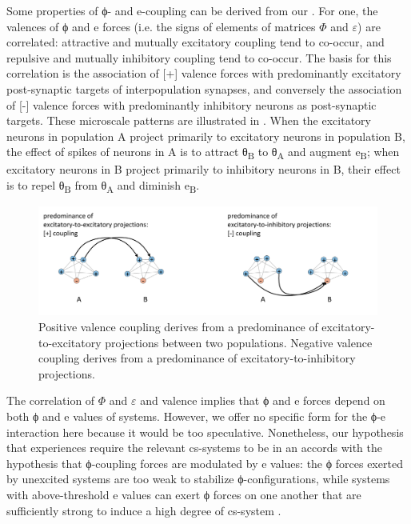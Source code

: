 

  Some properties of ϕ- and e-coupling can be derived from our . For one, the valences of ϕ and e forces (i.e. the signs of elements of matrices $\Phi$ and $\varepsilon $) are correlated: attractive and mutually excitatory coupling tend to co-occur, and repulsive and mutually inhibitory coupling tend to co-occur. The basis for this correlation is the association of [+] valence forces with predominantly excitatory post-synaptic targets of interpopulation synapses, and conversely the association of [-] valence forces with predominantly inhibitory neurons as post-synaptic targets. These microscale patterns are illustrated in {}. When the excitatory neurons in population A project primarily to excitatory neurons in population B, the effect of spikes of neurons in A is to attract θ\textsubscript{B} to θ\textsubscript{A} and augment e\textsubscript{B}; when excitatory neurons in B project primarily to inhibitory neurons in B, their effect is to repel θ\textsubscript{B} from θ\textsubscript{A} and diminish e\textsubscript{B}. 

  
\begin{figure}
\includegraphics[width=\textwidth]{figures/Tilsen-img21.png}
\caption{Positive valence coupling derives from a predominance of excitatory-to-excitatory projections between two populations. Negative valence coupling derives from a predominance of excitatory-to-inhibitory projections.}
\label{fig:2:14}
\end{figure}
 

  The correlation of $\Phi$ and $\varepsilon $ and valence implies that ϕ and e forces depend on both ϕ and e values of systems. However, we offer no specific form for the ϕ-e interaction here because it would be too speculative. Nonetheless, our hypothesis that  experiences require the relevant cs-systems to be in an  accords with the hypothesis that ϕ-coupling forces are modulated by e values: the ϕ forces exerted by unexcited systems are too weak to stabilize ϕ-configurations, while systems with above-threshold e values can exert ϕ forces on one another that are sufficiently strong to induce a high degree of cs-system .

